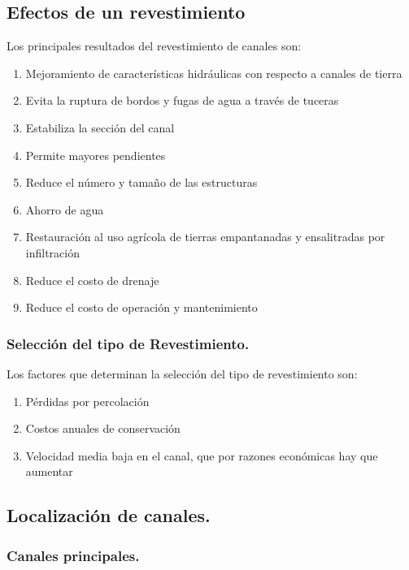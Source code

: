 \subsection{Efectos de un revestimiento}

Los principales resultados del revestimiento de canales son:

\begin{enumerate}
	\item Mejoramiento de características hidráulicas con respecto a canales de tierra
	\item Evita la ruptura de bordos y fugas de agua a través de tuceras
	\item Estabiliza la sección del canal
	\item Permite mayores pendientes
	\item Reduce el número y tamaño de las estructuras
	\item Ahorro de agua
	\item Restauración al uso agrícola de tierras empantanadas y ensalitradas por infiltración
	\item Reduce el costo de drenaje
	\item Reduce el costo de operación y mantenimiento
\end{enumerate}

\subsubsection{Selección del tipo de Revestimiento.}

Los factores que determinan la selección del tipo de revestimiento son:

\begin{enumerate}
	\item Pérdidas por percolación
	\item Costos anuales de conservación
	\item Velocidad media baja en el canal, que por razones económicas hay que aumentar
\end{enumerate}

\subsection{Localización de canales.}

\subsubsection{Canales principales.}

